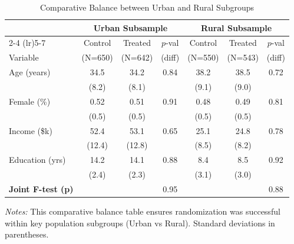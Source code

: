 \documentclass{article}
\begin{document}
\begin{landscape}
\begin{table}[htbp]
    \centering
    \begin{threeparttable}
    \caption{Comparative Balance between Urban and Rural Subgroups}
    \label{tab:balance_subgroups}
    \begin{tabular}{l ccc ccc}
        \toprule
        & \multicolumn{3}{c}{\textbf{Urban Subsample}} & \multicolumn{3}{c}{\textbf{Rural Subsample}} \\
        \cmidrule(lr){2-4} \cmidrule(lr){5-7}
        & {Control} & {Treated} & {$p$-val} & {Control} & {Treated} & {$p$-val} \\
        Variable & {(N=650)} & {(N=642)} & {(diff)} & {(N=550)} & {(N=543)} & {(diff)} \\
        \midrule
        Age (years)      & 34.5  & 34.2  & 0.84 & 38.2  & 38.5  & 0.72 \\
                         & (8.2) & (8.1) &      & (9.1) & (9.0) &      \\
        Female (\%)      & 0.52  & 0.51  & 0.91 & 0.48  & 0.49  & 0.81 \\
                         & (0.5) & (0.5) &      & (0.5) & (0.5) &      \\
        Income (\$k)     & 52.4  & 53.1  & 0.65 & 25.1  & 24.8  & 0.78 \\
                         & (12.4)& (12.8)&      & (8.5) & (8.2) &      \\
        Education (yrs)  & 14.2  & 14.1  & 0.88 & 8.4   & 8.5   & 0.92 \\
                         & (2.4) & (2.3) &      & (3.1) & (3.0) &      \\
        \midrule
        \textbf{Joint F-test (p)} & & & 0.95 & & & 0.88 \\
        \bottomrule
    \end{tabular}
    \begin{tablenotes}
        \small
        \item \textit{Notes:} This comparative balance table ensures randomization was successful within key population subgroups (Urban vs Rural). Standard deviations in parentheses.
    \end{tablenotes}
    \end{threeparttable}
\end{table}
\end{landscape}
\end{document}
